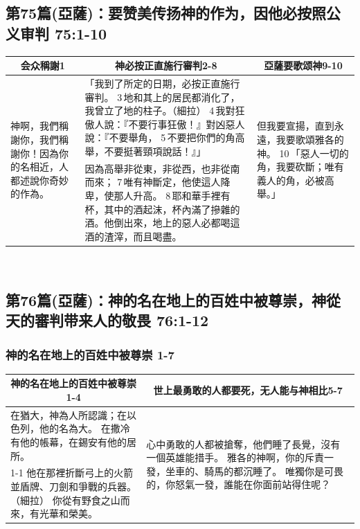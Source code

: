 \subsection{第75篇(亞薩)：要赞美传扬神的作为，因他必按照公义审判  75:1-10}
\begin{table}[H]
\centering
\begin{tabular}{p{2cm}|p{12.00cm}|p{3.00cm}}\hline\hline
\multicolumn{1}{c|}{会众稱謝1}&\multicolumn{1}{c|}{神必按正直施行審判2-8}&\multicolumn{1}{c}{ 亞薩要歌颂神9-10}\\\hline
\multirow{2}{2.2cm}{神啊，我們稱謝你，我們稱謝你！因為你的名相近，人都述說你奇妙的作為。}
&「我到了所定的日期，必按正直施行審判。
3 地和其上的居民都消化了，我曾立了地的柱子。（細拉）
4 我對狂傲人說：『不要行事狂傲！』對凶惡人說：『不要舉角，
5 不要把你們的角高舉，不要挺著頸項說話！』」
&\multirow{2}{3.2cm}{但我要宣揚，直到永遠，我要歌頌雅各的神。
10 「惡人一切的角，我要砍斷；唯有義人的角，必被高舉。」}\\\cline{2-2}
&因為高舉非從東，非從西，也非從南而來；
7 唯有神斷定，他使這人降卑，使那人升高。
8 耶和華手裡有杯，其中的酒起沫，杯內滿了摻雜的酒。他倒出來，地上的惡人必都喝這酒的渣滓，而且喝盡。
&\\\hline
\end{tabular}
\end{table} 


\subsection{第76篇(亞薩)：神的名在地上的百姓中被尊崇，神從天的審判带来人的敬畏  76:1-12}
\subsubsection{神的名在地上的百姓中被尊崇  1-7}
\begin{table}[H]\centering
\begin{tabular}{p{}|p{8.1cm}}\hline\hline
\multicolumn{1}{c|}{神的名在地上的百姓中被尊崇  1-4}&\multicolumn{1}{c}{世上最勇敢的人都要死，无人能与神相比5-7}\\\hline
在猶大，神為人所認識；在以色列，他的名為大。
在撒冷有他的帳幕，在錫安有他的居所。
&\multirow{2}{8.2cm}{心中勇敢的人都被搶奪，他們睡了長覺，沒有一個英雄能措手。
雅各的神啊，你的斥責一發，坐車的、騎馬的都沉睡了。
唯獨你是可畏的，你怒氣一發，誰能在你面前站得住呢？}\\\cline{1-1}
他在那裡折斷弓上的火箭並盾牌、刀劍和爭戰的兵器。（細拉）
你從有野食之山而來，有光華和榮美。&\\\hline
\end{tabular}
\end{table} 

